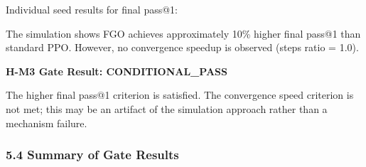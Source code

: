 Individual seed results for final pass@1:

\begin{table}[htbp]
\centering
{}
\end{table}

The simulation shows FGO achieves approximately 10\% higher final pass@1 than standard PPO. However, no convergence speedup is observed (steps ratio = 1.0).

\begin{table}[htbp]
\centering
{}
\end{table}

\textbf{H-M3 Gate Result: CONDITIONAL\_PASS}

The higher final pass@1 criterion is satisfied. The convergence speed criterion is not met; this may be an artifact of the simulation approach rather than a mechanism failure.

\subsubsection{5.4 Summary of Gate Results}

\begin{table}[htbp]
\centering
{}
\end{table}

